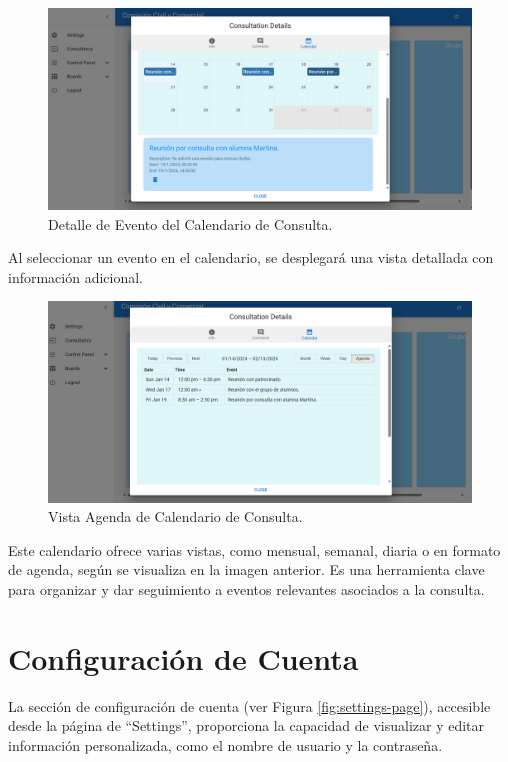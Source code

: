 \begin{figure}[H]
    \centering
    \includegraphics[width=1\linewidth]{fig/consulta-calendar-2.png}
    \caption{Detalle de Evento del Calendario de Consulta.}
    \label{fig:consulta-calendar-2}
\end{figure}
Al seleccionar un evento en el calendario, se desplegará una vista detallada con información adicional.

\begin{figure}[H]
    \centering
    \includegraphics[width=1\linewidth]{fig/consulta-calendar-3.png}
    \caption{Vista Agenda de Calendario de Consulta.}
    \label{fig:consulta-calendar-3}
\end{figure}

Este calendario ofrece varias vistas, como mensual, semanal, diaria o en formato de agenda, según se visualiza en la imagen anterior. Es una herramienta clave para organizar y dar seguimiento a eventos relevantes asociados a la consulta.

\section{Configuración de Cuenta}\label{sec:configuracion-cuenta}

La sección de configuración de cuenta (ver Figura \ref{fig:settings-page}), accesible desde la página de ``Settings'', proporciona la capacidad de visualizar y editar información personalizada, como el nombre de usuario y la contraseña.

